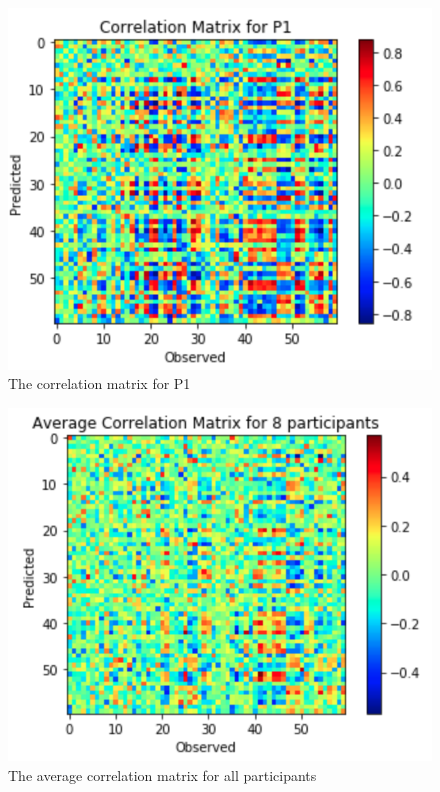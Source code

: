 \documentclass{article}
\begin{document}
\begin{figure}
\centering
\includegraphics[scale=0.3]{P1corr.png}
\caption{The correlation matrix for P1}
\label{corr_mat}
\end{figure}

\begin{figure}
\centering
\includegraphics[scale=0.3]{avgcorr.png}
\caption{The average correlation matrix for all participants}
\label{avg_corr}
\end{figure}
\end{document}
